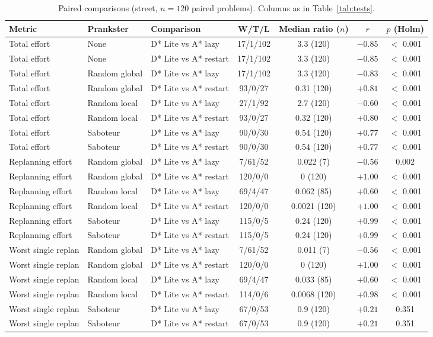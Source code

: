 \begin{table}[!t]
\centering
\footnotesize
\caption{Paired comparisons (street, $n=120$ paired problems). Columns as in Table~\ref{tab:tests}.}
\label{tab:tests-street}
\begin{tabular}{lllcccc}
\toprule
Metric & Prankster & Comparison & W/T/L & Median ratio ($n$) & $r$ & $p$ (Holm) \\
\midrule
Total effort & None & D* Lite vs A* lazy & 17/1/102 & 3.3 (120) & $-0.85$ & $<$ 0.001 \\
Total effort & None & D* Lite vs A* restart & 17/1/102 & 3.3 (120) & $-0.85$ & $<$ 0.001 \\
Total effort & Random global & D* Lite vs A* lazy & 17/1/102 & 3.3 (120) & $-0.83$ & $<$ 0.001 \\
Total effort & Random global & D* Lite vs A* restart & 93/0/27 & 0.31 (120) & $+0.81$ & $<$ 0.001 \\
Total effort & Random local & D* Lite vs A* lazy & 27/1/92 & 2.7 (120) & $-0.60$ & $<$ 0.001 \\
Total effort & Random local & D* Lite vs A* restart & 93/0/27 & 0.32 (120) & $+0.80$ & $<$ 0.001 \\
Total effort & Saboteur & D* Lite vs A* lazy & 90/0/30 & 0.54 (120) & $+0.77$ & $<$ 0.001 \\
Total effort & Saboteur & D* Lite vs A* restart & 90/0/30 & 0.54 (120) & $+0.77$ & $<$ 0.001 \\
\midrule
Replanning effort & Random global & D* Lite vs A* lazy & 7/61/52 & 0.022 (7) & $-0.56$ & 0.002 \\
Replanning effort & Random global & D* Lite vs A* restart & 120/0/0 & 0 (120) & $+1.00$ & $<$ 0.001 \\
Replanning effort & Random local & D* Lite vs A* lazy & 69/4/47 & 0.062 (85) & $+0.60$ & $<$ 0.001 \\
Replanning effort & Random local & D* Lite vs A* restart & 120/0/0 & 0.0021 (120) & $+1.00$ & $<$ 0.001 \\
Replanning effort & Saboteur & D* Lite vs A* lazy & 115/0/5 & 0.24 (120) & $+0.99$ & $<$ 0.001 \\
Replanning effort & Saboteur & D* Lite vs A* restart & 115/0/5 & 0.24 (120) & $+0.99$ & $<$ 0.001 \\
\midrule
Worst single replan & Random global & D* Lite vs A* lazy & 7/61/52 & 0.011 (7) & $-0.56$ & $<$ 0.001 \\
Worst single replan & Random global & D* Lite vs A* restart & 120/0/0 & 0 (120) & $+1.00$ & $<$ 0.001 \\
Worst single replan & Random local & D* Lite vs A* lazy & 69/4/47 & 0.033 (85) & $+0.60$ & $<$ 0.001 \\
Worst single replan & Random local & D* Lite vs A* restart & 114/0/6 & 0.0068 (120) & $+0.98$ & $<$ 0.001 \\
Worst single replan & Saboteur & D* Lite vs A* lazy & 67/0/53 & 0.9 (120) & $+0.21$ & 0.351 \\
Worst single replan & Saboteur & D* Lite vs A* restart & 67/0/53 & 0.9 (120) & $+0.21$ & 0.351 \\
\bottomrule
\end{tabular}
\end{table}
